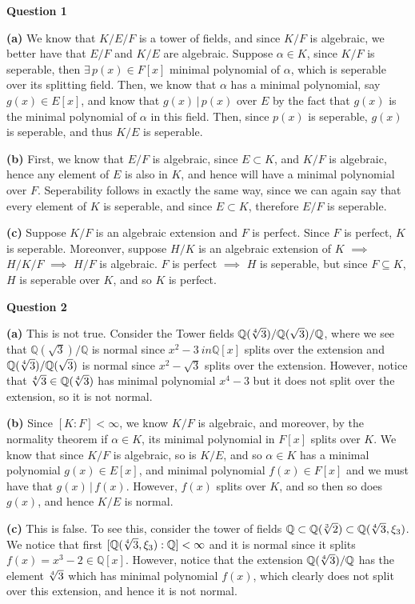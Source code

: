 \documentclass[10pt]{article}
\newcommand{\Q}{\mathbb{Q}}
\begin{document}
\textbf{Question 1}

\textbf{(a)} We know that $K/E/F$ is a tower of fields, and since $K/F$ is algebraic, we better have that $E/F$ and $K/E$ are algebraic. Suppose $\alpha \in K$, since $K/F$ is seperable, then $\exists\, p(x) \in F[x]$ minimal polynomial of $\alpha$, which is seperable over its splitting field. Then, we know that $\alpha$ has a minimal polynomial, say $g(x) \in E[x]$, and know that $g(x) \, | \, p(x)$ over $E$ by the fact that $g(x)$ is the minimal polynomial of $\alpha$ in this field. Then, since $p(x)$ is seperable, $g(x)$ is seperable, and thus $K/E$ is seperable.

\textbf{(b)} First, we know that $E/F$ is algebraic, since $E \subset K$, and $K/F$ is algebraic, hence any element of $E$ is also in $K$, and hence will have a minimal polynomial over $F$. Seperability follows in exactly the same way, since we can again say that every element of $K$ is seperable, and since $E\subset K$, therefore $E/F$ is seperable.

\textbf{(c)} Suppose $K/F$ is an algebraic extension and $F$ is perfect. Since $F$ is perfect, $K$ is seperable. Moreonver, suppose $H/K$ is an algebraic extension of $K$ $\implies$ $H/K/F$ $\implies$ $H/F$ is algebraic. $F$ is perfect $\implies$ $H$ is seperable, but since $F \subseteq K$, $H$ is seperable over $K$, and so $K$ is perfect.

\newpage
\textbf{Question 2}

\textbf{(a)} This is not true. Consider the Tower fields $\Q(\sqrt[\leftroot{1}\uproot{0}4]{3})/\Q(\sqrt{3})/\Q$, where we see that $\Q(\sqrt{3})/\Q$ is normal since $x^{2} - 3\ in \Q[x]$ splits over the extension and $\Q(\sqrt[\leftroot{1}\uproot{0}4]{3})/\Q(\sqrt{3})$ is normal since $x^{2} - \sqrt{3}$ splits over the extension. However, notice that $\sqrt[\leftroot{1}\uproot{0}4]{3} \in \Q(\sqrt[\leftroot{1}\uproot{0}4]{3})$ has minimal polynomial $x^{4} - 3$ but it does not split over the extension, so it is not normal.

\textbf{(b)} Since $[K:F] < \infty$, we know $K/F$ is algebraic, and moreover, by the normality theorem if $\alpha \in K$, its minimal polynomial in $F[x]$ splits over $K$. We know that since $K/F$ is algebraic, so is $K/E$, and so $\alpha \in K$ has a minimal polynomial $g(x) \in E[x]$, and minimal polynomial $f(x) \in F[x]$ and we must have that $g(x)\, |\, f(x)$. However, $f(x)$ splits over $K$, and so then so does $g(x)$, and hence $K/E$ is normal.

\textbf{(c)} This is false. To see this, consider the tower of fields $\Q \subset \Q(\sqrt[\leftroot{1}\uproot{0}3]{2}) \subset \Q(\sqrt[\leftroot{1}\uproot{0}4]{3},\xi_{3})$. We notice that first $[\Q(\sqrt[\leftroot{1}\uproot{0}4]{3},\xi_{3}):\Q] < \infty$ and it is normal since it splits $f(x) = x^{3} - 2 \in \Q[x]$. However, notice that the extension $\Q(\sqrt[\leftroot{1}\uproot{0}4]{3})/\Q$ has the element $\sqrt[\leftroot{1}\uproot{0}4]{3}$ which has minimal polynomial $f(x)$, which clearly does not split over this extension, and hence it is not normal.
\end{document}
